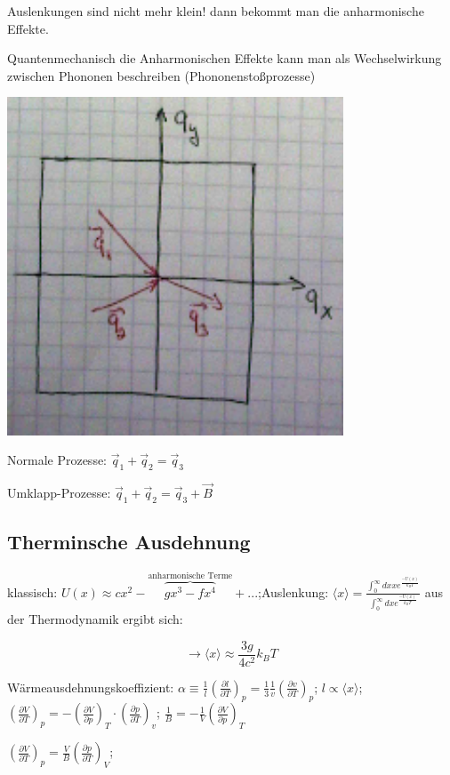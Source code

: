 Auslenkungen sind nicht mehr klein! dann bekommt man die anharmonische Effekte. 

Quantenmechanisch die Anharmonischen Effekte kann man als Wechselwirkung zwischen Phononen beschreiben (Phononenstoßprozesse)

\includegraphics[width=0.75\textwidth]{kap06_16.png}

Normale Prozesse: \(\vec q_1+\vec q_2=\vec q_3\)

Umklapp-Prozesse: \(\vec q_1+\vec q_2=\vec q_3+\vec B\)

\subsection{Therminsche Ausdehnung}
klassisch: \(U(x)\approx cx^2-\overbrace{gx^3-fx^4}^{\text{anharmonische Terme}}+...\);Auslenkung: \(\langle x\rangle = \frac{\int_0^\infty dx x e^{\frac{-U(x)}{k_BT}}}{\int_0^\infty dx e^{\frac{-U(x)}{k_BT}}}\) aus der Thermodynamik ergibt sich:

\[\rightarrow \langle x \rangle \approx \frac{3g}{4c^2}k_B T\]

Wärmeausdehnungskoeffizient:  \(\alpha\equiv \frac{1}{l} \left( \frac{\partial l}{\partial T}\right)_p=\frac{1}{3} \frac{1}{v}\left( \frac{\partial v}{\partial T}\right)_p\); \(l\propto \langle x \rangle\);
  \(\left( \frac{\partial V}{\partial T}\right)_p=-\left( \frac{\partial V}{\partial p}\right)_T\cdot \left( \frac{\partial p}{\partial T}\right)_v\); \(\frac{1}{B}=-\frac{1}{V}\left( \frac{\partial V}{\partial p}\right)_T\)


\(\left( \frac{\partial V}{\partial T}\right)_p = \frac{V}{B}\left( \frac{\partial p}{\partial T}\right)_V\); 

